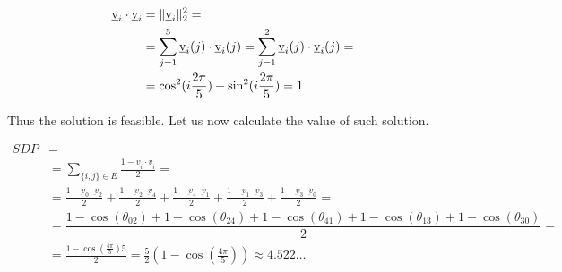 
    \begin{equation*}
        \begin{split}
            \underbar{v}_i \cdot \underbar{v}_i &= \lVert \underbar{v}_i \rVert_2^2 =\\
                &= \sum_{j=1}^{5} \underbar{v}_i(j) \cdot \underbar{v}_i(j) = \sum_{j=1}^{2} \underbar{v}_i(j) \cdot \underbar{v}_i(j) =\\
                &= \cos^2(i \frac{2\pi}{5}) + \sin^2(i \frac{2\pi}{5}) = 1
        \end{split}
    \end{equation*}

    Thus the solution is feasible.
    Let us now calculate the value of such solution.


    \begin{equation*}
        \begin{split}
            SDP &=\\
                &= \sum_{\{i,j\} \in E} \frac{1 - \underbar{v}_i \cdot \underbar{v}_i}{2} =\\
                &= \frac{1 - \underbar{v}_0 \cdot \underbar{v}_2}{2} + \frac{1 - \underbar{v}_2 \cdot \underbar{v}_4}{2} + \frac{1 - \underbar{v}_4 \cdot \underbar{v}_1}{2} + \frac{1 - \underbar{v}_1 \cdot \underbar{v}_3}{2} + \frac{1 - \underbar{v}_3 \cdot \underbar{v}_0}{2} =\\
                &= \dfrac{1 - \cos(\theta_{02}) + 1 - \cos(\theta_{24}) + 1 - \cos(\theta_{41}) + 1 - \cos(\theta_{13}) + 1 - \cos(\theta_{30})}{2} =\\
                &= \frac{1 - \cos(\frac{4\pi}{5}) 5}{2} = \frac{5}{2} (1 - \cos (\frac{4\pi}{5})) \approx 4.522\dots
        \end{split}
    \end{equation*}

